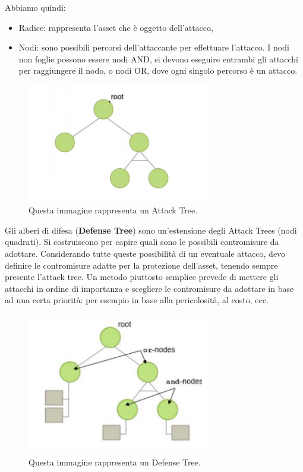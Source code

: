 Abbiamo quindi:

\begin{itemize}
    \item Radice: rappresenta l'asset che è oggetto dell'attacco,
    \item Nodi: sono possibili percorsi dell'attaccante per effettuare l'attacco.
          I nodi non foglie possono essere nodi AND, si devono eseguire entrambi
          gli attacchi per raggiungere il nodo, o nodi OR, dove ogni singolo
          percorso è un attacco.
\end{itemize}

\begin{figure}[H]
    \centering
    \includegraphics[width=8cm, keepaspectratio]{capitoli/risks/imgs/atree.png}
    \caption{Questa immagine rappresenta un Attack Tree.}
\end{figure}

Gli alberi di difesa (\textbf{Defense Tree}) sono un'estensione degli
Attack Trees (nodi quadrati). Si costruiscono per capire
quali sono le possibili contromisure da adottare.
Considerando tutte queste possibilità di un eventuale attacco,
devo definire le contromisure adatte per la protezione
dell'asset, tenendo sempre presente l'attack tree.
Un metodo piuttosto semplice prevede di mettere gli attacchi
in ordine di importanza e scegliere le contromisure da
adottare in base ad una certa priorità: per esempio in base
alla pericolosità, al costo, ecc.

\begin{figure}[H]
    \centering
    \includegraphics[width=8cm, keepaspectratio]{capitoli/risks/imgs/dtree.png}
    \caption{Questa immagine rappresenta un Defense Tree.}
\end{figure}

